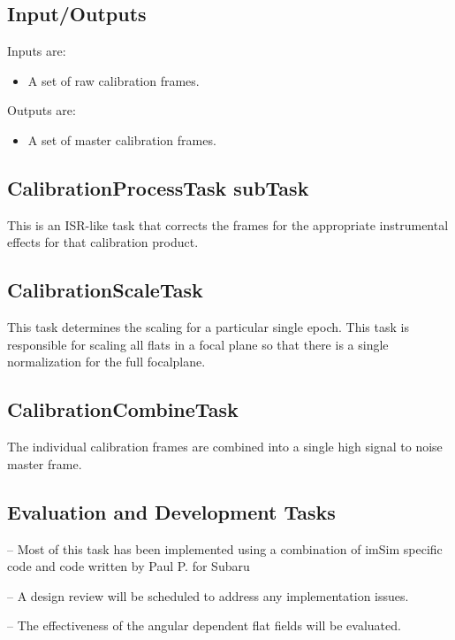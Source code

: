 \documentclass[12pt]{article}
\begin{document}
\subsection{Input/Outputs}
Inputs are:
\begin{itemize}
\item A set of raw calibration frames.
\end{itemize}
Outputs are:
\begin{itemize}
\item A set of master calibration frames.
\end{itemize}

\subsection{CalibrationProcessTask subTask}
This is an ISR-like task that corrects the frames for the appropriate instrumental effects for that calibration
product.
\subsection{CalibrationScaleTask}
This task determines the scaling for a particular single epoch.  This task is responsible for
scaling all flats in a focal plane so that there is a single normalization for the full focalplane.
\subsection{CalibrationCombineTask}
The individual calibration frames are combined into a single high signal to noise master frame. 

\subsection{Evaluation and Development Tasks}
-- Most of this task has been implemented using a combination of imSim specific code and code written by Paul P. for Subaru

-- A design review will be scheduled to address any implementation issues.

-- The effectiveness of the angular dependent flat fields will be evaluated.



\clearpage 
\end{document}
